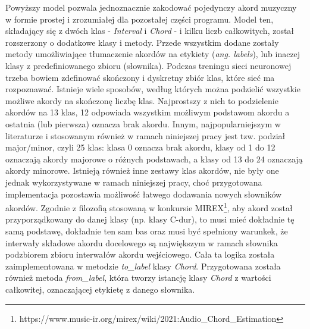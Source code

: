 Powyższy model pozwala jednoznacznie zakodować pojedynczy akord muzyczny w formie prostej i
zrozumiałej dla pozostałej części programu. Model ten, składający się z dwóch klas - \emph{Interval}
i \emph{Chord} - i kilku liczb całkowitych, został rozszerzony o dodatkowe klasy i metody. Przede
wszystkim dodane zostały metody umożliwiające tłumaczenie akordów na etykiety (\emph{ang. labels}),
lub inaczej klasy z predefiniowanego zbioru (słownika). Podczas treningu sieci neuronowej trzeba
bowiem zdefinować skończony i dyskretny zbiór klas, które sieć ma rozpoznawać. Istnieje wiele
sposobów, według których można podzielić wszystkie możliwe akordy na skończonę liczbę klas.
Najprostszy z nich to podzielenie akordów na 13 klas, 12 odpowiada wszystkim możliwym podstawom
akordu a ostatnia (lub pierwsza) oznacza brak akordu. Innym, najpopularniejszym w literaturze i
stosowanym również w ramach niniejszej pracy jest tzw. podział major/minor, czyli 25 klas: klasa 0
oznacza brak akordu, klasy od 1 do 12 oznaczają akordy majorowe o różnych podstawach, a klasy od 13
do 24 oznaczają akordy minorowe. Istnieją również inne zestawy klas akordów, nie były one jednak
wykorzystywane w ramach niniejszej pracy, choć przygotowana implementacja pozostawia możliwość
łatwego dodawania nowych słowników akordów. Zgodnie z filozofią stosowaną w konkursie
MIREX\footnote{https://www.music-ir.org/mirex/wiki/2021:Audio_Chord_Estimation}, aby akord został
przyporządkowany do danej klasy (np. klasy C-dur), to musi mieć dokładnie tę samą podstawę,
dokładnie ten sam bas oraz musi być spełniony warunkek, że interwały składowe akordu docelowego są
największym w ramach słownika podzbiorem zbioru interwałów akordu wejściowego. Cała ta logika
została zaimplementowana w metodzie \emph{to\_label} klasy \emph{Chord}. Przygotowana została
również metoda \emph{from\_label}, która tworzy istancję klasy \emph{Chord} z wartości całkowitej,
oznaczającej etykietę z danego słownika.

